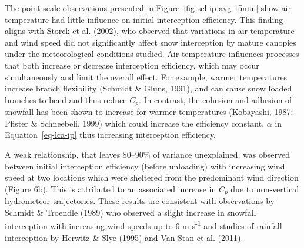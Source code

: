 \documentclass[
  letterpaper,
  DIV=11,
  numbers=noendperiod]{scrartcl}
\begin{document}
The point scale observations presented in
Figure~\ref{fig-scl-ip-avg-15min} show air temperature had little
influence on initial interception efficiency. This finding aligns with
Storck et al. (2002), who observed that variations in air temperature
and wind speed did not significantly affect snow interception by mature
canopies under the meteorological conditions studied. Air temperature
influences processes that both increase or decrease interception
efficiency, which may occur simultaneously and limit the overall effect.
For example, warmer temperatures increase branch flexibility (Schmidt \&
Gluns, 1991), and can cause snow loaded branches to bend and thus reduce
\(C_p\). In contrast, the cohesion and adhesion of snowfall has been
shown to increase for warmer temperatures (Kobayashi, 1987; Pfister \&
Schneebeli, 1999) which could increase the efficiency constant,
\(\alpha\) in Equation~\ref{eq-lca-ip} thus increasing interception
efficiency.

A weak relationship, that leaves 80--90\% of variance unexplained, was
observed between initial interception efficiency (before unloading) with
increasing wind speed at two locations which were sheltered from the
predominant wind direction (Figure 6b). This is attributed to an
associated increase in \(C_p\) due to non-vertical hydrometeor
trajectories. These results are consistent with observations by Schmidt
\& Troendle (1989) who observed a slight increase in snowfall
interception with increasing wind speeds up to 6 m s\textsuperscript{-1}
and studies of rainfall interception by Herwitz \& Slye (1995) and Van
Stan et al. (2011).
\end{document}
